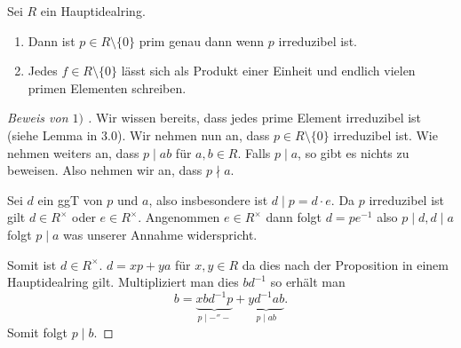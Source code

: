\begin{theorem}
	Sei $R$ ein Hauptidealring.
	\begin{enumerate}[1)]
		\item Dann ist $p \in R \setminus \{0\} $ prim genau dann wenn $p$ irreduzibel ist.
		\item Jedes $f \in R \setminus \{0\} $ lässt sich als Produkt einer Einheit und endlich vielen primen Elementen schreiben.
	\end{enumerate}
\end{theorem}

\begin{proof}[Beweis von $1)$ ]
	Wir wissen bereits, dass jedes prime Element irreduzibel ist (siehe Lemma in $3.0$).
	Wir nehmen nun an, dass $p \in R \setminus \{0\} $ irreduzibel ist.
	Wie nehmen weiters an, dass $p \mid ab$ für $a,b \in R$.
	Falls $p \mid a$, so gibt es nichts zu beweisen.
	Also nehmen wir an, dass $p \nmid a$.

	Sei $d$ ein ggT von $p$ und $a$, also insbesondere ist $d \mid p = d \cdot e$.
	Da $p$ irreduzibel ist gilt $d \in R^{\times}$ oder $e \in R^{\times}$.
	Angenommen $e \in R^{\times}$ dann folgt $d = p e^{-1}$ also $p \mid d, d \mid a$ folgt $p \mid a$ was unserer Annahme widerspricht.

	Somit ist $d \in R^{\times}$. $d = x p + y a$ für $x,y \in R$ da dies nach der Proposition in einem Hauptidealring gilt.
	Multipliziert man dies $b d^{-1}$ so erhält man
	\[
		b = \underbrace{x b d ^{-1} p}_{p \mid -''-} + \underbrace{y d ^{-1} a b}_{p \mid ab}
	.\] 
	Somit folgt $p \mid b$.
\end{proof}

















